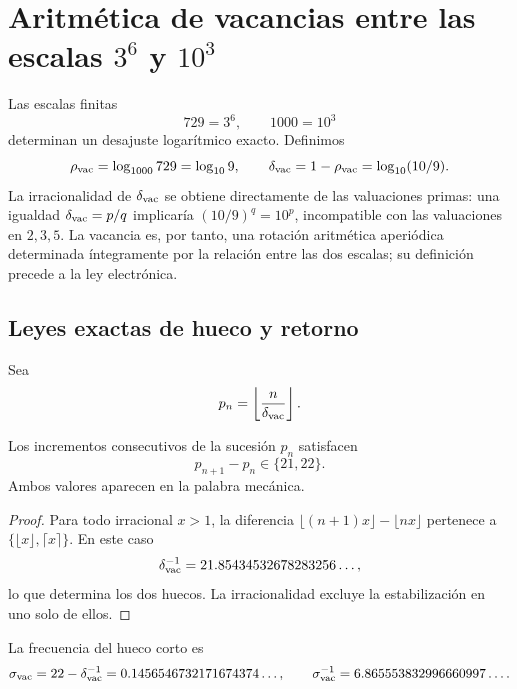 \section{Aritmética de vacancias entre las escalas \texorpdfstring{\(3^6\)}{3 elevado a 6} y \texorpdfstring{\(10^3\)}{10 elevado a 3}}
\label{sec:vacancias-corriente-electron-rev11}

Las escalas finitas
\[
 729=3^6,
 \qquad
 1000=10^3
\]
determinan un desajuste logarítmico exacto. Definimos
\begin{equation}
 \rho_{\rm vac}=\log_{1000}729=\log_{10}9,
 \qquad
 \delta_{\rm vac}=1-\rho_{\rm vac}=\log_{10}(10/9).
 \label{eq:delta-vacancias-rev11}
\end{equation}
La irracionalidad de \(\delta_{\rm vac}\) se obtiene directamente de las
valuaciones primas: una igualdad
\(\delta_{\rm vac}=p/q\) implicaría
\((10/9)^q=10^p\), incompatible con las valuaciones en \(2,3,5\).
La vacancia es, por tanto, una rotación aritmética aperiódica determinada
íntegramente por la relación entre las dos escalas; su definición precede a
la ley electrónica.

\subsection{Leyes exactas de hueco y retorno}

Sea
\[
 p_n=\left\lfloor\frac{n}{\delta_{\rm vac}}\right\rfloor.
\]

\begin{theorem}
\label{thm:ley-huecos-vacancias-rev11}
Los incrementos consecutivos de la sucesión \(p_n\) satisfacen
\[
 p_{n+1}-p_n\in\{21,22\}.
\]
Ambos valores aparecen en la palabra mecánica.
\end{theorem}

\begin{proof}
Para todo irracional \(x>1\), la diferencia
\(\lfloor(n+1)x\rfloor-\lfloor nx\rfloor\) pertenece a
\(\{\lfloor x\rfloor,\lceil x\rceil\}\). En este caso
\[
 \delta_{\rm vac}^{-1}
 =21.85434532678283256\ldots,
\]
lo que determina los dos huecos. La irracionalidad excluye la estabilización
en uno solo de ellos.
\end{proof}

La frecuencia del hueco corto es
\[
 \sigma_{\rm vac}=22-\delta_{\rm vac}^{-1}
 =0.1456546732171674374\ldots,
 \qquad
 \sigma_{\rm vac}^{-1}=6.865553832996660997\ldots.
\]

